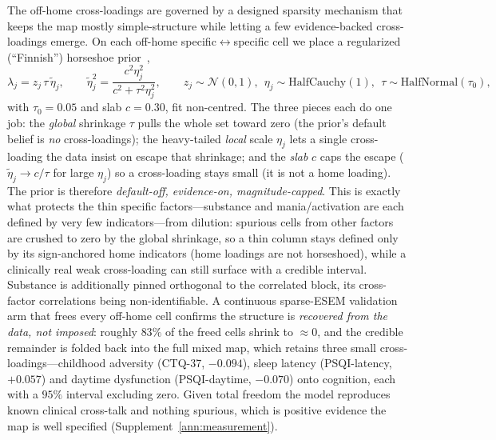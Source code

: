 The off-home cross-loadings are governed by a designed sparsity mechanism that keeps the
map mostly simple-structure while letting a few evidence-backed cross-loadings emerge.
On each off-home specific$\leftrightarrow$specific cell we place a regularized
(``Finnish'') horseshoe prior~\citep{carvalho2009horseshoe,piironen2017horseshoe},
\begin{equation}
  \lambda_j=z_j\,\tau\,\tilde\eta_j,\qquad
  \tilde\eta_j^{2}=\frac{c^{2}\eta_j^{2}}{c^{2}+\tau^{2}\eta_j^{2}},\qquad
  z_j\sim\mathcal N(0,1),\ \ \eta_j\sim\mathrm{HalfCauchy}(1),\ \ \tau\sim\mathrm{HalfNormal}(\tau_0),
  \label{eq:m-horseshoe}
\end{equation}
with $\tau_0=0.05$ and slab $c=0.30$, fit non-centred. The three pieces each do one job: the
\emph{global} shrinkage $\tau$ pulls the whole set toward zero (the prior's default belief is
\emph{no} cross-loadings); the heavy-tailed \emph{local} scale $\eta_j$ lets a single
cross-loading the data insist on escape that shrinkage; and the \emph{slab} $c$ caps the
escape ($\tilde\eta_j\to c/\tau$ for large $\eta_j$) so a cross-loading stays small (it is not
a home loading). The prior is therefore \emph{default-off, evidence-on, magnitude-capped}.
This is exactly what protects the thin specific factors---substance and mania/activation are
each defined by very few indicators---from dilution: spurious cells from other factors are
crushed to zero by the global shrinkage, so a thin column stays defined only by its
sign-anchored home indicators (home loadings are not horseshoed), while a clinically real weak
cross-loading can still surface with a credible interval. Substance is additionally pinned
orthogonal to the correlated block, its cross-factor correlations being non-identifiable. A
continuous sparse-ESEM validation arm that frees every off-home cell confirms the structure is
\emph{recovered from the data, not imposed}: roughly $83\%$ of the freed cells shrink to
$\approx 0$, and the credible remainder is folded back into the full mixed map, which retains
three small cross-loadings---childhood adversity (CTQ-37, $-0.094$), sleep latency
(PSQI-latency, $+0.057$) and daytime dysfunction (PSQI-daytime, $-0.070$) onto cognition, each
with a $95\%$ interval excluding zero. Given total freedom the model reproduces known clinical
cross-talk and nothing spurious, which is positive evidence the map is well specified
(Supplement~\ref{ann:measurement}).

